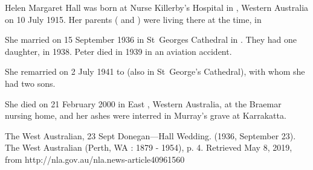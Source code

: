 
Helen Margaret Hall was born at Nurse Killerby's Hospital in , Western Australia\cite{HMHbirthNotice}
on 10 July 1915.\cite{HMHbirth}
Her parents ( and ) were living there at the time,
in

She married  on 15 September 1936 in St~Georges Cathedral in .\cite{MargPeterMarriage}
They had one daughter, in 1938.\cite{JHBirthNotice}
Peter died in 1939 in an aviation accident.

She remarried on 2 July 1941\cite{MurrayMargMarriageNotice} to 
(also in St~George's Cathedral\cite{MurrayMargMarriageNotice}), with whom she had two sons.

She died on 21 February 2000 in East , Western Australia, at the Braemar nursing home,
and her ashes were interred in Murray's grave at Karrakatta.

The West Australian, 23 Sept
Donegan—Hall Wedding. (1936, September 23). The West Australian (Perth, WA : 1879 - 1954), p. 4. Retrieved May 8, 2019, from http://nla.gov.au/nla.news-article40961560

